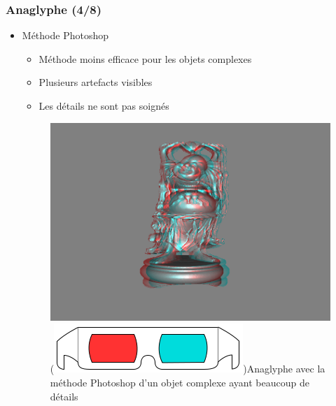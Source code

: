 \documentclass{beamer}
\begin{document}
%
\begin{frame}
\frametitle{Anaglyphe (4/8)}
\begin{itemize}[label=$\bullet$]
\item Méthode Photoshop \cite{stereoAnaglyph}
	\begin{itemize}[label=$\circ$]
	\item Méthode moins efficace pour les objets complexes 
	\item Plusieurs artefacts visibles
	\item Les détails ne sont pas soignés
	\end{itemize}
\begin{figure}
\centering
\includegraphics[scale=0.3]{happy_photoshop.png}
\caption{(\includegraphics[scale=0.1]{lunettes.png})Anaglyphe avec la méthode Photoshop d'un objet complexe ayant beaucoup de détails }
\end{figure}
	
\end{itemize}

\end{frame}
\end{document}
